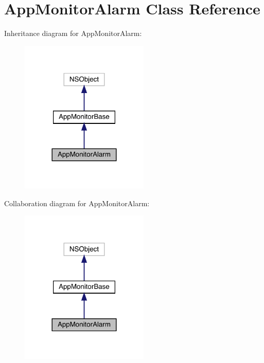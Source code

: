 \hypertarget{interface_app_monitor_alarm}{}\section{App\+Monitor\+Alarm Class Reference}
\label{interface_app_monitor_alarm}


Inheritance diagram for App\+Monitor\+Alarm\+:\nopagebreak
\begin{figure}[H]
\begin{center}
\leavevmode
\includegraphics[width=173pt]{interface_app_monitor_alarm__inherit__graph}
\end{center}
\end{figure}


Collaboration diagram for App\+Monitor\+Alarm\+:\nopagebreak
\begin{figure}[H]
\begin{center}
\leavevmode
\includegraphics[width=173pt]{interface_app_monitor_alarm__coll__graph}
\end{center}
\end{figure}
